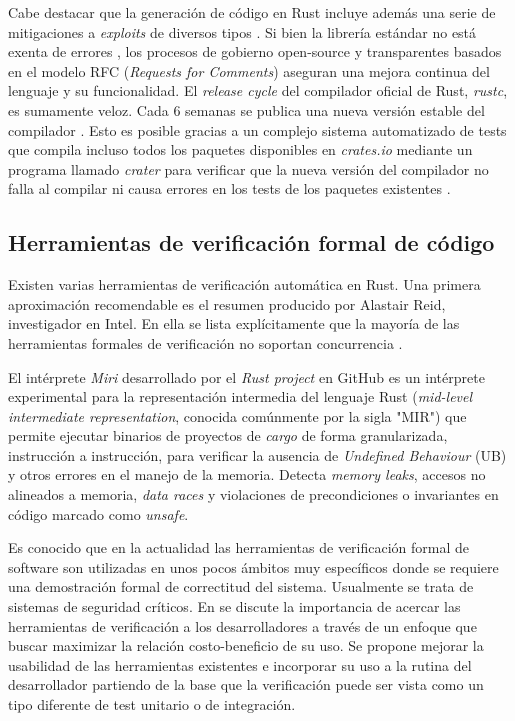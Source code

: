 \documentclass[12pt]{article}
\begin{document}
Cabe destacar que la generación de código en Rust incluye además una serie de mitigaciones a \textit{exploits} de diversos tipos \cite{rustc-mitigations}.
Si bien la librería estándar no está exenta de errores \cite{davidoff2018},
los procesos de gobierno open-source y transparentes basados en el modelo RFC (\textit{Requests for Comments})\cite{rust-rfcs}
aseguran una mejora continua del lenguaje y su funcionalidad.
El \textit{release cycle} del compilador oficial de Rust, \textit{rustc}, es sumamente veloz.
Cada 6 semanas se publica una nueva versión estable del compilador \cite{rust-book-release-cycle}.
Esto es posible gracias a un complejo sistema automatizado de tests que compila incluso todos los paquetes disponibles en \textit{crates.io}
mediante un programa llamado \textit{crater} para verificar que
la nueva versión del compilador no falla al compilar ni causa errores en los tests de los paquetes existentes \cite{albini2019}.

\subsection{Herramientas de verificación formal de código}

Existen varias herramientas de verificación automática en Rust.
Una primera aproximación recomendable es el resumen producido por Alastair Reid, investigador en Intel.
En ella se lista explícitamente que la mayoría de las herramientas formales de verificación no soportan concurrencia \cite{reid2021}.

El intérprete \textit{Miri} desarrollado por el \textit{Rust project} en GitHub es un intérprete experimental para la representación intermedia del lenguaje Rust
(\textit{mid-level intermediate representation}, conocida comúnmente por la sigla "MIR")
que permite ejecutar binarios de proyectos de \textit{cargo} de forma granularizada, instrucción a instrucción, para verificar la ausencia de \textit{Undefined Behaviour} (UB) y otros
errores en el manejo de la memoria.
Detecta \textit{memory leaks}, accesos no alineados a memoria, \textit{data races} y violaciones de precondiciones o invariantes en código marcado como \textit{unsafe}. \cite{miri-website}

Es conocido que en la actualidad las herramientas de verificación formal de software son utilizadas en unos pocos ámbitos muy específicos
donde se requiere una demostración formal de correctitud del sistema. Usualmente se trata de sistemas de seguridad críticos.
En \cite{reid:hatra:2020} se discute la importancia de acercar las herramientas de verificación a los desarrolladores
a través de un enfoque que buscar maximizar la relación costo-beneficio de su uso.
Se propone mejorar la usabilidad de las herramientas existentes e incorporar su uso a la rutina del desarrollador partiendo
de la base que la verificación puede ser vista como un tipo diferente de test unitario o de integración.
\end{document}
